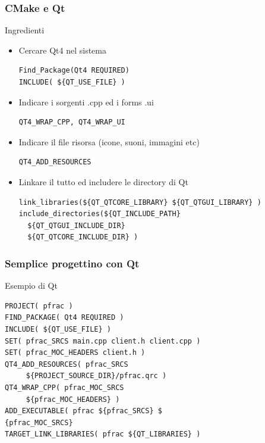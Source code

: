 \documentclass[10pt] {beamer}
\begin{document}
\begin{frame}[fragile]
 \frametitle{CMake e Qt}
\begin{block}{Ingredienti}

\begin{itemize} 
\item <1-> Cercare Qt4 nel sistema
\begin{verbatim}
Find_Package(Qt4 REQUIRED)
INCLUDE( ${QT_USE_FILE} )
\end{verbatim}
\item <2-> Indicare i sorgenti .cpp ed i forms .ui
\begin{verbatim}
QT4_WRAP_CPP, QT4_WRAP_UI 
\end{verbatim}
\item <3-> Indicare il file risorsa (icone, suoni, immagini etc)
\begin{verbatim}
QT4_ADD_RESOURCES
\end{verbatim}
\item<4-> Linkare il tutto ed includere le directory di Qt
\begin{small}
\begin{verbatim}
link_libraries(${QT_QTCORE_LIBRARY} ${QT_QTGUI_LIBRARY} )
include_directories(${QT_INCLUDE_PATH} 
  ${QT_QTGUI_INCLUDE_DIR}
  ${QT_QTCORE_INCLUDE_DIR} )
\end{verbatim}
\end{small}
\end{itemize}

\end{block}
\end{frame}

\begin{frame}[fragile]
 \frametitle{Semplice progettino con Qt}
\begin{block}{Esempio di Qt}
 \begin{small}
\begin{verbatim}
PROJECT( pfrac )
FIND_PACKAGE( Qt4 REQUIRED )
INCLUDE( ${QT_USE_FILE} )
SET( pfrac_SRCS main.cpp client.h client.cpp )
SET( pfrac_MOC_HEADERS client.h )
QT4_ADD_RESOURCES( pfrac_SRCS 
     ${PROJECT_SOURCE_DIR}/pfrac.qrc )
QT4_WRAP_CPP( pfrac_MOC_SRCS 
     ${pfrac_MOC_HEADERS} )
ADD_EXECUTABLE( pfrac ${pfrac_SRCS} $
{pfrac_MOC_SRCS} 
TARGET_LINK_LIBRARIES( pfrac ${QT_LIBRARIES} )
\end{verbatim}
\end{small}
\end{block}

\end{frame}
\end{document}
